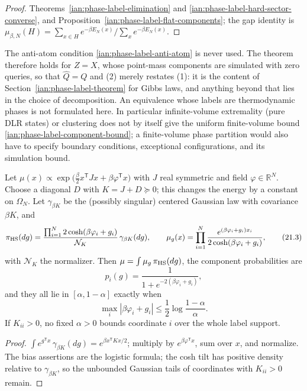\begin{proof}
Theorems~\ref{ian:phase-label-elimination} and
\ref{ian:phase-label-hard-sector-converse}, and
Proposition~\ref{ian:phase-label-flat-components}; the gap identity is
\(\mu_{\beta,N}(H)=\sum_{x\in H}e^{-\beta E_N(x)}/\sum_xe^{-\beta E_N(x)}\).
\end{proof}

The anti-atom condition \eqref{ian:phase-label-anti-atom} is never used.
The theorem therefore holds for \(Z=X\), whose point-mass components are
simulated with zero queries, so that \(\widehat Q=Q\) and (2) merely
restates (1): it is
the content of Section~\ref{ian:phase-label-theorem} for Gibbs laws, and
anything beyond that lies in the choice of decomposition. An equivalence
whose labels are thermodynamic phases is not formulated here. In
particular infinite-volume extremality (pure DLR states) or clustering
does not by itself give the uniform finite-volume bound
\eqref{ian:phase-label-component-bound}; a finite-volume phase partition
would also have to specify boundary conditions, exceptional
configurations, and its simulation bound.

\begin{proposition}
\label{ian:phase-label-hubbard-stratonovich}
Let
\(\mu(x)\propto\exp\bigl(\frac\beta2x^\mathsf TJx+\beta\varphi^\mathsf Tx\bigr)\)
with \(J\) real symmetric and field \(\varphi\in\mathbb R^N\). Choose a
diagonal \(D\) with \(K=J+D\succeq0\); this changes the energy by a
constant on \(\Omega_N\). Let \(\gamma_{\beta K}\) be the (possibly
singular) centered Gaussian law with covariance \(\beta K\), and
\[
 \pi_{\rm HS}(dg)
 =\frac{\prod_{i=1}^N2\cosh(\beta\varphi_i+g_i)}
         {\mathcal N_K}\,\gamma_{\beta K}(dg),
 \qquad
 \mu_g(x)
 =\prod_{i=1}^N
       \frac{e^{(\beta\varphi_i+g_i)x_i}}
            {2\cosh(\beta\varphi_i+g_i)},
 \tag{21.3}\label{ian:phase-label-hs-mixture}
\]
with \(\mathcal N_K\) the normalizer. Then \(\mu=\int\mu_g\,\pi_{\rm HS}(dg)\),
the component probabilities are
\[
 p_i(g)=\frac1{1+e^{-2(\beta\varphi_i+g_i)}},
 \tag{21.4}\label{ian:phase-label-hs-bias}
\]
and they all lie in \([\alpha,1-\alpha]\) exactly when
\[
 \max_i|\beta\varphi_i+g_i|
 \le \frac12\log\frac{1-\alpha}{\alpha}.
 \tag{21.5}\label{ian:phase-label-hs-bias-event}
\]
If \(K_{ii}>0\), no fixed \(\alpha>0\) bounds coordinate \(i\) over the
whole label support.
\end{proposition}

\begin{proof}
\(\int e^{g^\mathsf Tx}\,\gamma_{\beta K}(dg)=e^{\beta x^\mathsf TKx/2}\);
multiply by \(e^{\beta\varphi^\mathsf Tx}\), sum over \(x\), and normalize.
The bias assertions are the logistic formula; the cosh tilt has positive
density relative to \(\gamma_{\beta K}\), so the unbounded Gaussian tails
of coordinates with \(K_{ii}>0\) remain.
\end{proof}

